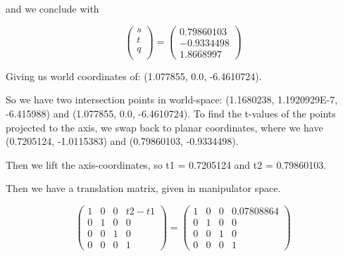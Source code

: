 \documentclass{letter}
\begin{document}
and we conclude with 

$$
\begin{pmatrix}
s \\
t \\
q\\
\end{pmatrix}
=
\begin{pmatrix}
0.79860103 \\ -0.9334498 \\ 1.8668997
\end{pmatrix}
$$

Giving us world coordinates of: ({1.077855, 0.0, -6.4610724}). 

So we have two intersection points in world-space: ({1.1680238, 1.1920929E-7, -6.415988}) and ({1.077855, 0.0, -6.4610724}). To find the t-values of the points projected to the axis, we swap back to planar coordinates, where we have (0.7205124, -1.0115383) and (0.79860103, -0.9334498).

Then we lift the axis-coordinates, so t1 = 0.7205124 and t2 = 0.79860103. 

Then we have a translation matrix, given in manipulator space. 

$$
\begin{pmatrix}
1 & 0 & 0 & t2 - t1 \\
0 & 1 & 0 & 0 \\
0 & 0 & 1 & 0 \\
0 & 0 & 0 & 1
\end{pmatrix}
= 
\begin{pmatrix}
1 & 0 & 0 & 0.07808864 \\
0 & 1 & 0 & 0 \\
0 & 0 & 1 & 0 \\
0 & 0 & 0 & 1
\end{pmatrix}
$$
\end{document}
